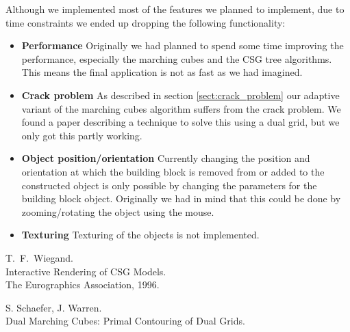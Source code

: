 \documentclass[a4wide,10pt,twocolumn]{article}
\begin{document}
Although we implemented most of the features we planned to implement, due to time constraints we ended up dropping the following functionality:

\begin{itemize}
    \item[] \textbf{Performance} Originally we had planned to spend some time improving the performance, especially the marching cubes and the CSG tree algorithms. This means the final application is not as fast as we had imagined.
    \item[] \textbf{Crack problem} As described in section \ref{sect:crack_problem} our adaptive variant of the marching cubes algorithm suffers from the crack problem. We found a paper \cite{DMC} describing a technique to solve this using a dual grid, but we only got this partly working.
    \item[] \textbf{Object position/orientation} Currently changing the position and orientation at which the building block is removed from or added to the constructed object is only possible by changing the parameters for the building block object. Originally we had in mind that this could be done by zooming/rotating the object using the mouse.
    \item[] \textbf{Texturing} Texturing of the objects is not implemented.
\end{itemize}




\begin{thebibliography}{99}
    T.~F.~Wiegand.\\
    Interactive Rendering of CSG Models.\\
    The Eurographics Association, 1996.

    S. Schaefer, J. Warren. \\
    Dual Marching Cubes: Primal Contouring of Dual Grids. \\

\end{thebibliography}
\end{document}
